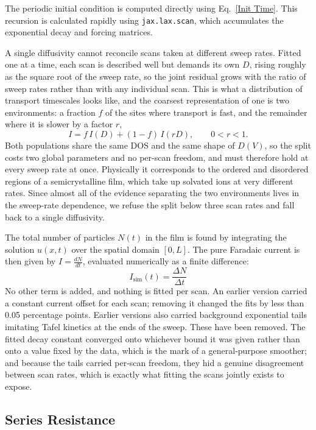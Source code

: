 \documentclass{article}
\begin{document}
The periodic initial condition is computed directly using Eq.~\ref{Init Time}. This recursion is calculated rapidly using \texttt{jax.lax.scan}, which accumulates the exponential decay and forcing matrices. 

A single diffusivity cannot reconcile scans taken at different sweep rates. Fitted one at a time, each scan is described well but demands its own $D$, rising roughly as the square root of the sweep rate, so the joint residual grows with the ratio of sweep rates rather than with any individual scan. This is what a distribution of transport timescales looks like, and the coarsest representation of one is two environments: a fraction $f$ of the sites where transport is fast, and the remainder where it is slower by a factor $r$,
\begin{equation}
    I = f\, I(D) + (1-f)\, I(rD), \qquad 0 < r < 1.
\end{equation}
Both populations share the same DOS and the same shape of $D(V)$, so the split costs two global parameters and no per-scan freedom, and must therefore hold at every sweep rate at once. Physically it corresponds to the ordered and disordered regions of a semicrystalline film, which take up solvated ions at very different rates. Since almost all of the evidence separating the two environments lives in the sweep-rate dependence, we refuse the split below three scan rates and fall back to a single diffusivity.

The total number of particles $N(t)$ in the film is found by integrating the solution $u(x,t)$ over the spatial domain $[0,L]$. The pure Faradaic current is then given by $I = \frac{dN}{dt}$, evaluated numerically as a finite difference:
\begin{equation}
    I_{\text{sim}}(t) = \frac{\Delta N}{\Delta t}
\end{equation}
No other term is added, and nothing is fitted per scan. An earlier version carried a constant current offset for each scan; removing it changed the fits by less than 0.05 percentage points.
Earlier versions also carried background exponential tails imitating Tafel kinetics at the ends of the sweep. These have been removed. The fitted decay constant converged onto whichever bound it was given rather than onto a value fixed by the data, which is the mark of a general-purpose smoother; and because the tails carried per-scan freedom, they hid a genuine disagreement between scan rates, which is exactly what fitting the scans jointly exists to expose.

\subsection{Series Resistance}
\end{document}
